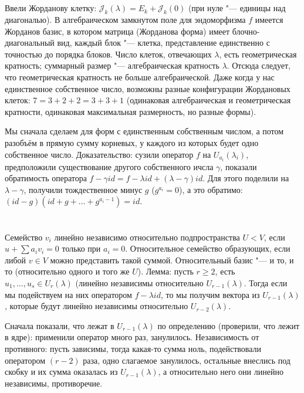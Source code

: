 \section{} %
Ввели Жорданову клетку: $\mathcal{J}_k(\lambda)=E_k+\mathcal{J}_k(0)$ (при нуле "--- единицы над диагональю).
В алгебраическом замкнутом поле для эндоморфизма $f$ имеется Жорданов базис, в котором матрица (Жорданова форма) имеет блочно-диагональный вид,
каждый блок "--- клетка, представление единственно с точностью до порядка блоков.
Число клеток, отвечающих $\lambda$, есть геометрическая кратность; суммарный размер "--- алгебраическая кратность $\lambda$.
Отсюда следует, что геометрическая кратность не больше алгебраической.
Даже когда у нас единственное собственное число, возможны разные конфигурации Жордановых клеток: $7=3+2+2=3+3+1$ (одинаковая алгебраическая и геометрическая кратности, одинаковая максимальная размерность, но разные формы).

Мы сначала сделаем для форм с единственным собственным числом, а потом разобъём в прямую сумму корневых, у каждого из которых будет одно собственное число.
Доказательство: сузили оператор $f$ на $U_{a_i}(\lambda_i)$, предположили существование другого собственного ичсла $\gamma$, показали обратимость оператора $f-\gamma id=f-\lambda id +(\lambda - \gamma)id$.
Для этого поделили на $\lambda - \gamma$, получили тождественное минус $g$ ($g^{a_i}=0$), а это обратимо: $(id-g)(id+g+\dots+g^{a_i-1})=id$.

\section{} %
Семейство $v_i$ линейно независимо относительно подпространства $U < V$, если $u + \sum a_i v_i = 0$ только при $a_i=0$.
Относительное семейство образующих, если либой $v \in V$ можно представить такой суммой.
Относительный базис "--- и то, и то (относительно одного и того же $U$).
Лемма: пусть $r \ge 2$, есть $u_1, \dots, u_s \in U_r(\lambda)$ (линейно независимы относительно $U_{r-1}(\lambda)$.
Тогда если мы подействуем на них оператором $f-\lambda id$, то мы получим вектора из $U_{r-1}(\lambda)$, которые будут линейно независимы относительно $U_{r-2}(\lambda)$.

Сначала показали, что лежат в $U_{r-1}(\lambda)$ по определению (проверили, что лежит в ядре): применили оператор много раз, занулилось.
Независимость от противного: пусть зависимы, тогда какая-то сумма ноль, подействовали оператором $(r-2)$ раза, одно слагаемое занулилось,
остальные внеслись под скобку и их сумма оказалась из $U_{r-1}(\lambda)$, а относительно него они линейно независимы, противоречие.

